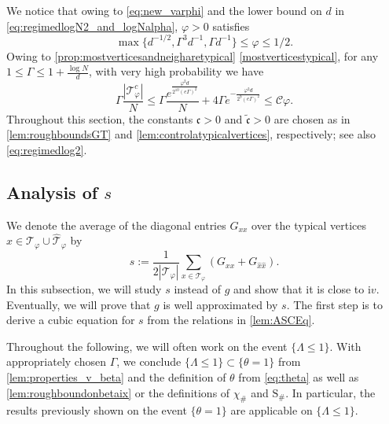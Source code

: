 \documentclass[10pt,a4paper]{amsart}
\newcommand{\ii}{\mathrm{i}}
\newcommand{\abs}[1]{\left| #1 \right|}
\newcommand{\ccc}{\mathfrak{c}}
\numberwithin{equation}{section}
\newcommand*\ubarr[1]{{\widehat{#1}}}
\begin{document}
	We notice that owing to \eqref{eq:new_varphi} and the lower bound on $d$ in \eqref{eq:regimedlogN2_and_logNalpha}, $\varphi >0 $ satisfies 
	\begin{equation} \label{eq:d_inverse_square_root_smaller_varphi_a}
		\max\{d^{-1/2}, \Gamma^3 d^{-1}, \Gamma d^{-1}\} \le \varphi \le 1/2.
	\end{equation}
	 Owing to \cref{prop:mostverticesandneigharetypical} \cref{mostverticestypical}, 
	 for any $1 \leq \Gamma \leq 1 + \frac{\log N}{d}$, with very high probability we have
	\begin{equation}\label{eq:number_atypical_vertices} 
	 \Gamma 	\frac{\abs{\mathcal{T}^c_{\varphi}}}{N} \le\Gamma \frac{e^{\frac{\varphi^2d}{2^{10} (e\Gamma)^2}}}{N}  + 4 \Gamma e^{-\frac{\varphi^2d}{2^{9} (e\Gamma)^2}}   \le \mathcal{C}\varphi.
	\end{equation} 
	Throughout this section, the constants $\ccc>0$ and $\tilde{\ccc} >0 $ are 
	chosen as in \cref{lem:roughboundsGT} and \cref{lem:controlatypicalvertices}, respectively; see also \cref{eq:regimedlog2}. 

	
	

	\subsection{Analysis of $s$} 
	
	We denote the average of the diagonal entries $G_{xx}$ over the typical vertices $x \in \mathcal T_\varphi \cup \widehat{\mathcal T}_\varphi$ by 
	\begin{equation}\label{eq:meanoftypicalvertices}
		s:= \frac{1}{2\abs{\mathcal{T}_{\varphi}}} \sum_{x \in \mathcal{T}_{\varphi}} \left(G_{xx} + G_{\ubarr{x}\ubarr{x}}\right). 
	\end{equation} 
	In this subsection, we will study $s$ instead of $g$ and show that it is close to $\ii v$. 
	Eventually, we will prove that $g$ is well approximated by $s$. 
	The first step is to derive a cubic equation for $s$ from the relations in \cref{lem:ASCEq}.  
	
 Throughout the following, we will often work on the event $\{ \Lambda \leq 1\}$. 
	With appropriately chosen $\Gamma$, we conclude $\{ \Lambda \leq 1\} \subset \{ \theta = 1\}$ from \cref{lem:properties_v_beta} and the definition of $\theta$ from 
	\cref{eq:theta} as well as \cref{lem:roughboundonbetaix} or the definitions of $\chi_\#$ and $\mathrm{S}_\#$. In particular, the results previously shown on the event $\{ \theta =1\}$ are applicable on $\{ \Lambda \leq 1\}$. 
	
\end{document}
